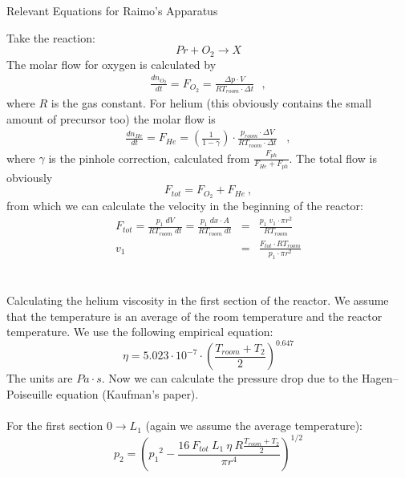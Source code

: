\documentclass[10pt, a4paper]{article}
\begin{document}
\begin{center}
\begin{huge}
Relevant Equations for Raimo's Apparatus
\end{huge}
\end{center}
Take the reaction: 
\begin{equation*}
Pr + O_2 \rightarrow X
\end{equation*}
The molar flow for oxygen is calculated by 
\begin{eqnarray*}
\frac{dn_{O_2}}{dt} = F_{O_2} = \frac{\Delta p \cdot V}{RT_{room} \cdot \Delta t} \:\:\:, 
\end{eqnarray*}
where $R$ is the gas constant. For helium (this obviously contains the small amount of precursor too) the molar flow is 
\begin{eqnarray*}
\frac{dn_{He}}{dt} = F_{He} = \left( \frac{1}{1 - \gamma} \right) \cdot \frac{p_{room} \cdot \Delta V}{RT_{room} \cdot \Delta t} \;\;\;,
\end{eqnarray*}
where $\gamma$ is the pinhole correction, calculated from $ \frac{F_{ph}}{F_{He} + F_{ph}} $. The total flow is obviously 
\begin{equation*}
F_{tot} = F_{O_2} + F_{He} \:, 
\end{equation*}
from which we can calculate the velocity in the beginning of the reactor: 
\begin{eqnarray*}
F_{tot} = \frac{p_1\;dV}{RT_{room}\;dt} = \frac{p_1\; dx \cdot A}{RT_{room}\;dt} &=& \frac{p_1\; v_1 \cdot \pi r^2}{RT_{room}} \\
v_1 &=& \frac{F_{tot} \cdot RT_{room}}{p_1 \cdot \pi r^2}
\end{eqnarray*}
\\
\\
Calculating the helium viscosity in the first section of the reactor. We assume that the temperature is an average of the room temperature and the reactor temperature. We use the following empirical equation: 
\begin{equation*}
\eta = 5.023\cdot 10^{-7} \cdot \left( \frac{T_{room} + T_2}{2} \right)^{0.647} 
\end{equation*}
The units are $Pa \cdot s$. Now we can calculate the pressure drop due to the Hagen–Poiseuille equation (Kaufman's paper). 
\\
\\
For the first section $0 \rightarrow L_1$ (again we assume the average temperature): 
\begin{equation*}
p_2 = \left( {p_1}^2 - \frac{16\:F_{tot} \: L_1 \: \eta \: R\frac{T_{room} + T_2}{2}}{\pi r^4} \right)^{1/2}
\end{equation*}
\end{document}

